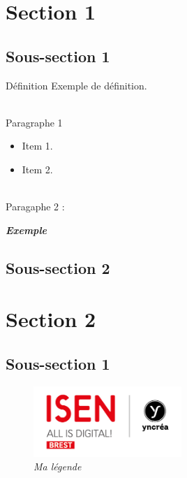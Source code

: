 \documentclass[10pt, french]{beamer}
\begin{document}
\makeMyTitle
\makeMyOutlines

\section{Section 1}
\subsection{Sous-section 1}
\begin{frame}
	\begin{block}{Définition}
		Exemple de définition.
	\end{block}
	\\
	\indent Paragraphe 1\\
	\begin{itemize}
		\item Item 1.
		\item Item 2.
	\end{itemize}
  \\
	\indent Paragaphe 2 :\\
	\centerline{\textcolor{redisen}{\textbf{\textit{Exemple}}}}
\end{frame}

\subsection{Sous-section 2}
\begin{frame}
\end{frame}

\section{Section 2}
\subsection{Sous-section 1}
\begin{frame}
  \begin{figure}
    \centering
    \includegraphics[width=0.5\textwidth]{Images/Logo_ISEN_Brest.jpg}
    \caption{\textit{Ma légende}}
  \end{figure}
\end{frame}

\makeMyQuestions
\end{document}

